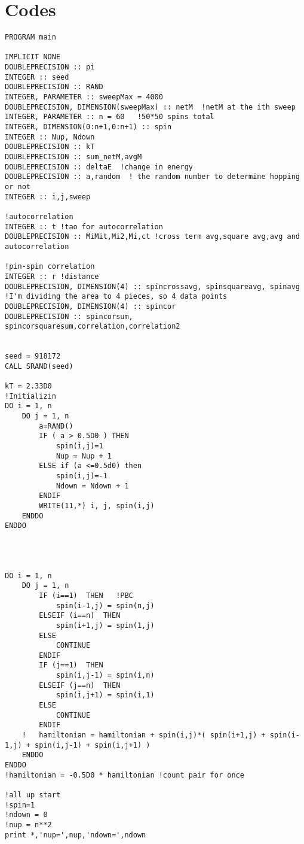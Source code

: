 \documentclass{article}
\begin{document}
\section{Codes}
\begin{verbatim}
PROGRAM main

IMPLICIT NONE
DOUBLEPRECISION :: pi
INTEGER :: seed
DOUBLEPRECISION :: RAND
INTEGER, PARAMETER :: sweepMax = 4000
DOUBLEPRECISION, DIMENSION(sweepMax) :: netM  !netM at the ith sweep
INTEGER, PARAMETER :: n = 60   !50*50 spins total
INTEGER, DIMENSION(0:n+1,0:n+1) :: spin  
INTEGER :: Nup, Ndown
DOUBLEPRECISION :: kT
DOUBLEPRECISION :: sum_netM,avgM 
DOUBLEPRECISION :: deltaE  !change in energy
DOUBLEPRECISION :: a,random  ! the random number to determine hopping or not
INTEGER :: i,j,sweep

!autocorrelation
INTEGER :: t !tao for autocorrelation
DOUBLEPRECISION :: MiMit,Mi2,Mi,ct !cross term avg,square avg,avg and autocorrelation

!pin-spin correlation
INTEGER :: r !distance
DOUBLEPRECISION, DIMENSION(4) :: spincrossavg, spinsquareavg, spinavg !I'm dividing the area to 4 pieces, so 4 data points
DOUBLEPRECISION, DIMENSION(4) :: spincor
DOUBLEPRECISION :: spincorsum, spincorsquaresum,correlation,correlation2


seed = 918172
CALL SRAND(seed)

kT = 2.33D0
!Initializin
DO i = 1, n
	DO j = 1, n
	    a=RAND()
		IF ( a > 0.5D0 ) THEN
		    spin(i,j)=1
			Nup = Nup + 1
		ELSE if (a <=0.5d0) then
		    spin(i,j)=-1
			Ndown = Ndown + 1
		ENDIF
		WRITE(11,*) i, j, spin(i,j)
	ENDDO 
ENDDO 




DO i = 1, n
	DO j = 1, n
		IF (i==1)  THEN   !PBC
			spin(i-1,j) = spin(n,j)
		ELSEIF (i==n)  THEN
			spin(i+1,j) = spin(1,j)
		ELSE
			CONTINUE
		ENDIF
		IF (j==1)  THEN
			spin(i,j-1) = spin(i,n) 
		ELSEIF (j==n)  THEN
			spin(i,j+1) = spin(i,1)
		ELSE
			CONTINUE
		ENDIF
	!	hamiltonian = hamiltonian + spin(i,j)*( spin(i+1,j) + spin(i-1,j) + spin(i,j-1) + spin(i,j+1) )
	ENDDO
ENDDO
!hamiltonian = -0.5D0 * hamiltonian !count pair for once

!all up start
!spin=1   
!ndown = 0
!nup = n**2
print *,'nup=',nup,'ndown=',ndown


\end{verbatim}
\end{document}
